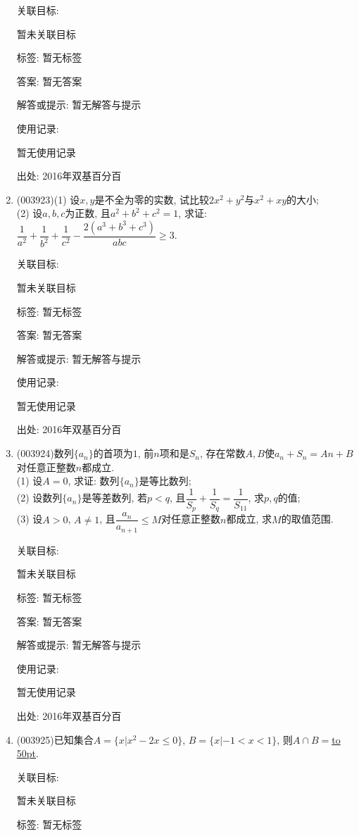 \documentclass[10pt,a4paper]{article}
\newcommand{\blank}[1]{\underline{\hbox to #1pt{}}}
\begin{document}
\begin{enumerate}[1.]
关联目标:

暂未关联目标



标签: 暂无标签

答案: 暂无答案

解答或提示: 暂无解答与提示

使用记录:

暂无使用记录


出处: 2016年双基百分百
\item { (003923)}(1) 设$x,y$是不全为零的实数, 试比较$2x^2+y^2$与$x^2+xy$的大小;\\
(2) 设$a,b,c$为正数, 且$a^2+b^2+c^2=1$, 求证: $\dfrac 1{a^2}+\dfrac 1{b^2}+\dfrac 1{c^2}-\dfrac{2(a^3+b^3+c^3)}{abc}\ge 3$.


关联目标:

暂未关联目标



标签: 暂无标签

答案: 暂无答案

解答或提示: 暂无解答与提示

使用记录:

暂无使用记录


出处: 2016年双基百分百
\item { (003924)}数列$\{a_n\}$的首项为$1$, 前$n$项和是$S_n$, 存在常数$A,B$使$a_n+S_n=An+B$对任意正整数$n$都成立.\\
(1) 设$A=0$, 求证: 数列$\{a_n\}$是等比数列;\\
(2) 设数列$\{a_n\}$是等差数列, 若$p<q$, 且$\dfrac{1}{S_p}+\dfrac{1}{S_q}=\dfrac{1}{S_{11}}$, 求$p,q$的值;\\
(3) 设$A>0$, $A\ne 1$, 且$\dfrac{a_n}{a_{n+1}}\le M$对任意正整数$n$都成立, 求$M$的取值范围.


关联目标:

暂未关联目标



标签: 暂无标签

答案: 暂无答案

解答或提示: 暂无解答与提示

使用记录:

暂无使用记录


出处: 2016年双基百分百
\item { (003925)}已知集合$A=\{x|x^2-2x\le 0 \}$, $B=\{x|-1<x<1\}$, 则$A\cap B=$\blank{50}.


关联目标:

暂未关联目标



标签: 暂无标签


\end{enumerate}
\end{document}
